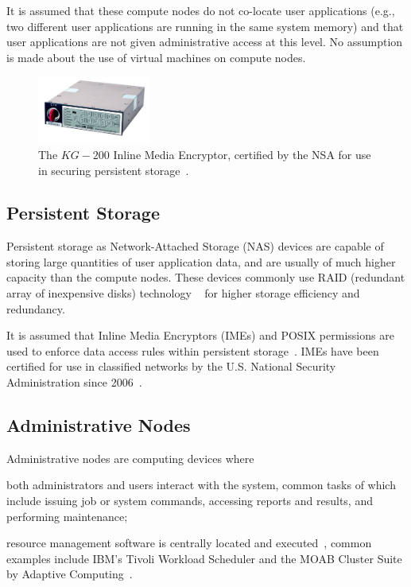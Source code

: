 \documentclass[oneside,12pt]{memoir}
\begin{document}
It is assumed that these compute nodes do not co-locate user applications (e.g., two different user applications are running in the same system memory) and that user applications are not given administrative access at this level. No assumption is made about the use of virtual machines on compute nodes.

\begin{figure}
  \begin{center}
    \includegraphics[width=0.33\textwidth]{inline_media_encryptor.jpg}
  \end{center}
  \caption{The $KG-200$ Inline Media Encryptor, certified by the NSA for use in securing persistent storage~\cite{nsa_ime_website}.}
\label{fig:inline_media_encryptor}
\end{figure}

\subsection{Persistent Storage}
Persistent storage as Network-Attached Storage (NAS) devices are capable of storing large quantities of user application data, and are usually of much higher capacity than the compute nodes.  These devices commonly use RAID (redundant array of inexpensive disks) technology ~\cite{katz1989disk} for higher storage efficiency and redundancy. 

It is assumed that Inline Media Encryptors (IMEs) and POSIX permissions are used to enforce data access rules within persistent storage~\cite{nsa_ime}. IMEs have been certified for use in classified networks by the U.S. National Security Administration since 2006~\cite{nsa_ime_website}. 

\subsection{Administrative Nodes}
Administrative nodes are computing devices where \begin{inparaenum}
\item both administrators and users interact with the system, common tasks of which include issuing job or system commands, accessing reports and results, and performing maintenance;
\item resource management software is centrally located and executed~\cite{keller2001anatomy}, common examples include IBM's Tivoli Workload Scheduler and the MOAB Cluster Suite by Adaptive Computing~\cite{arackal2009access}\cite{jackson2006demand}.
\end{inparaenum}
\end{document}
